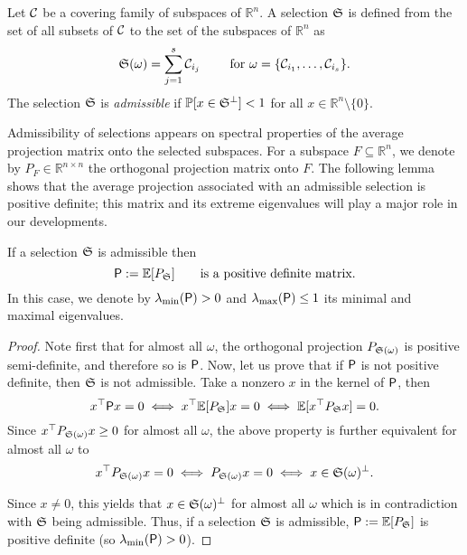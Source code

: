 {
\begin{definition}
Let $\mathcal{C}$ be a covering family of subspaces of $\mathbb{R}^n$. A selection $\mathfrak{S}$ is defined from the set of all subsets of $\mathcal{C}$ to the set of the subspaces of $\mathbb{R}^n$ as
 $$ \mathfrak{S}(\omega) = \sum_{j = 1}^s \mathcal{C}_{i_j} \qquad\text{ for } \omega = \{ \mathcal{C}_{i_1} ,\ldots, \mathcal{C}_{i_s} \} .$$
 The selection $\mathfrak{S}$ is \emph{admissible} if  $\mathbb{P}[x\in \mathfrak{S}^\perp]<1$ for all $x\in\mathbb{R}^n\setminus\{0\}$.
\end{definition}

{Admissibility of selections appears on spectral properties of the average projection matrix onto the selected subspaces. For a subspace $F \subseteq \mathbb{R}^n$, we denote by $P_F \in\mathbb{R}^{n\times n}$ the orthogonal projection matrix onto $F$. The following lemma shows that the average projection associated with an admissible selection is positive definite; this matrix and its extreme eigenvalues will play a major role in our developments.}

\begin{lemma}\label{lm:eligible}
If a selection $\mathfrak{S}$ is admissible then 
    \begin{equation}\label{eq:pbar}
        {\mathsf{P}} := \mathbb{E}[P_{\mathfrak{S}}]  \qquad\text{is a positive definite matrix.}
    \end{equation}
In this case, we denote by $\lambda_{\min}({\mathsf{P}})>0$ and $\lambda_{\max}({\mathsf{P}})\leq1$ its minimal and maximal eigenvalues.
\end{lemma}

\begin{proof}
Note first that for almost all $\omega$, the orthogonal projection $P_{\mathfrak{S}(\omega)}$ is positive semi-definite, and therefore so is ${\mathsf{P}}$. Now, let us prove that if ${\mathsf{P}}$ is not positive definite, then $\mathfrak{S}$ is not admissible. 
Take a nonzero $x$ in the kernel of ${\mathsf{P}}$, then
\begin{equation*}
    x^\top{\mathsf{P}} x = 0 \iff x^\top \mathbb{E}[P_{\mathfrak{S}}]x = 0 \iff   \mathbb{E}[x^\top P_{\mathfrak{S}} x] = 0.
\end{equation*}
Since $x^\top P_{\mathfrak{S}(\omega)}x\geq 0$ for almost all $\omega$, the above property is further equivalent for almost all $\omega$ to 
\begin{equation*}
    x^\top P_{\Sel(\omega)} x = 0 \iff P_{\Sel(\omega)} x = 0 
    \iff   x\in\Sel(\omega)^{\perp} . %
\end{equation*}
{Since $x\neq0$, this yields that $x\in\mathfrak{S}(\omega)^\perp$ for almost all $\omega$ which is in contradiction with $\mathfrak{S}$ being admissible. Thus, if a selection $\mathfrak{S}$ is admissible, $ {\mathsf{P}} := \mathbb{E}[P_{\mathfrak{S}}]$ is positive definite (so $\lambda_{\min}({\mathsf{P}})>0$). 

}
\end{proof}}
